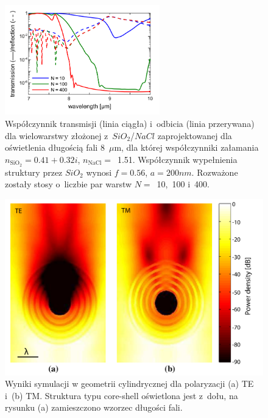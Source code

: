 \begin{figure}[tb]
	\centering
	\includegraphics[width=0.6\textwidth]{images/pml/oqe_trans_refl.png}
	\caption{Współczynnik transmisji (linia ciągła) i~odbicia (linia przerywana) dla wielowarstwy złożonej z~$SiO_2$/$NaCl$ zaprojektowanej dla oświetlenia długością fali 8~$\mu$m, dla której współczynniki załamania $n_{\textrm{SiO}_2}=0.41+0.32i$, $n_{\textrm{NaCl}}=$~1.51. Współczynnik wypełnienia struktury przez $SiO_2$ wynosi $f=0.56$, $a=200nm$. Rozważone zostały stosy o~liczbie par warstw $N=$~10,~100 i~400.}
	\label{fig:oqe-trans-refl}
\end{figure}

\begin{figure}[tb]
	\includegraphics[width=\textwidth]{images/pml/oqe_coreshell.png}
	\caption{Wyniki symulacji w geometrii cylindrycznej dla polaryzacji (a) TE i~(b) TM. Struktura typu core-shell oświetlona jest z~dołu, na rysunku (a) zamieszczono wzorzec długości fali.}
	\label{fig:oqecoreshell}
\end{figure}


